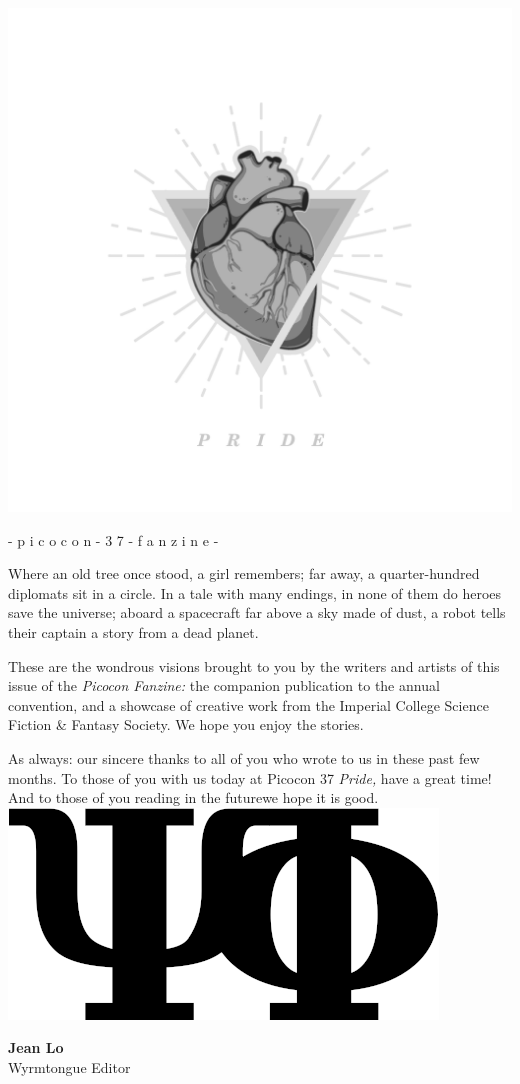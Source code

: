 \documentclass{picocon-fanzine}
\renewcommand{\tombstone}{%
  \includegraphics[height=\fontcharht\font`\B,clip]{img/tombstone}%
}
\begin{document}
\thispagestyle{empty}
\includegraphics[width=\textwidth]{img/cover}
\vfill
\begin{center}{\color{gray}- p i c o c o n - 3 7 - f a n z i n e -}\end{center}
\clearpage


Where an old tree once stood, a girl remembers; far away, a
quarter-hundred diplomats sit in a circle. In a tale with many
endings, in none of them do heroes save the universe; aboard a
spacecraft far above a sky made of dust, a robot tells their captain a
story from a dead planet.

These are the wondrous visions brought to you by the writers and
artists of this issue of the \textit{Picocon Fanzine:} the companion
publication to the annual convention, and a showcase of creative work
from the Imperial College Science Fiction \& Fantasy Society. We hope
you enjoy the stories.

As always: our sincere thanks to all of you who wrote to us in these
past few months. To those of you with us today at Picocon 37
\textit{Pride,} have a great time! And to those of you reading in the
future\textemdash we hope it is good. \tombstone{}

\hfill \parbox{0.5\textwidth}{{\large\textbf{Jean Lo}}\\Wyrmtongue
  Editor}
\vfill
\tableofcontents
\vfill
\end{document}

